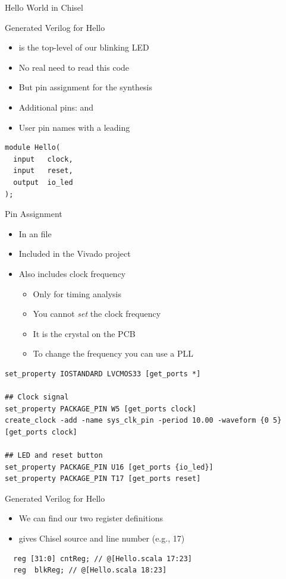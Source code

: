 \begin{frame}[fragile]{Hello World in Chisel}
\end{frame}

\begin{frame}[fragile]{Generated Verilog for Hello}
\begin{itemize}
\item {} is the top-level of our blinking LED
\item No real need to read this code
\item But pin assignment for the synthesis
\item Additional pins:  and 
\item User pin names with a leading 
\end{itemize}
\begin{verbatim}
module Hello(
  input   clock,
  input   reset,
  output  io_led
);
\end{verbatim}
\end{frame}

\begin{frame}[fragile]{Pin Assignment}
\begin{itemize}
\item In an  file
\item Included in the Vivado project
\item Also includes clock frequency
\begin{itemize}
\item Only for timing analysis
\item You cannot \emph{set} the clock frequency
\item It is the crystal on the PCB
\item To change the frequency you can use a PLL
\end{itemize}
\end{itemize}
{\tiny
\begin{verbatim}
set_property IOSTANDARD LVCMOS33 [get_ports *]

## Clock signal
set_property PACKAGE_PIN W5 [get_ports clock]
create_clock -add -name sys_clk_pin -period 10.00 -waveform {0 5} [get_ports clock]

## LED and reset button
set_property PACKAGE_PIN U16 [get_ports {io_led}]
set_property PACKAGE_PIN T17 [get_ports reset]
\end{verbatim}
}
\end{frame}


\begin{frame}[fragile]{Generated Verilog for Hello}
\begin{itemize}
\item We can find our two register definitions
\item {} gives Chisel source and line number (e.g., 17)
\end{itemize}
\begin{verbatim}
  reg [31:0] cntReg; // @[Hello.scala 17:23]
  reg  blkReg; // @[Hello.scala 18:23]
\end{verbatim}
\end{frame}

